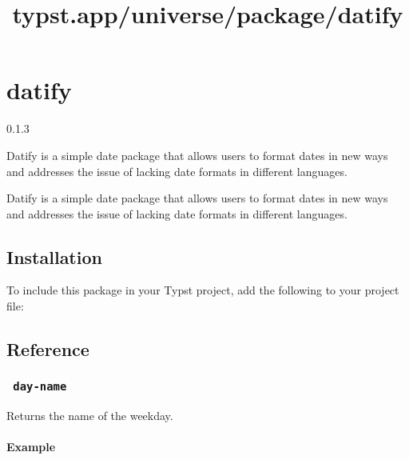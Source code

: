 \title{typst.app/universe/package/datify}

\label{banner}
\section{datify}\label{datify}

{ 0.1.3 }

Datify is a simple date package that allows users to format dates in new
ways and addresses the issue of lacking date formats in different
languages.

\label{readme}
Datify is a simple date package that allows users to format dates in new
ways and addresses the issue of lacking date formats in different
languages.

\subsection{Installation}\label{installation}

To include this package in your Typst project, add the following to your
project file:

\begin{Shaded}
\begin{Highlighting}[]
\end{Highlighting}
\end{Shaded}

\subsection{Reference}\label{reference}

\subsubsection{\texorpdfstring{\texttt{\ day-name\ }}{ day-name }}\label{day-name}

Returns the name of the weekday.

\paragraph{Example}\label{example}

\begin{Shaded}
\begin{Highlighting}[]

\end{Highlighting}
\end{Shaded}

